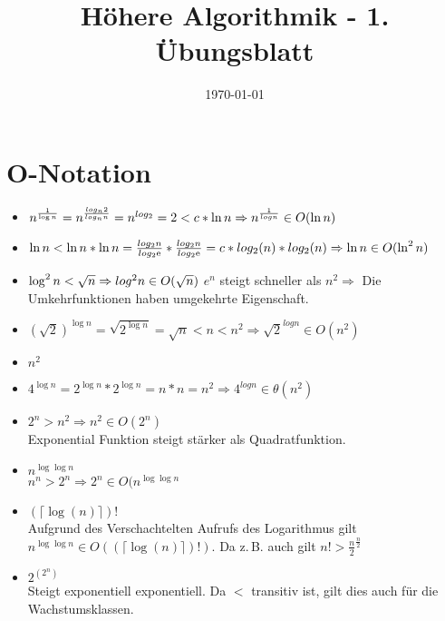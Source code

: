 \documentclass[a4paper,10pt]{scrartcl}
\title{H\"ohere Algorithmik - 1. \"Ubungsblatt}
\author{\Authors}
\date{\today}
\begin{document}
\maketitle

\section{$\boldsymbol{O}$-Notation}
\begin{itemize}
      \item $n^{\frac{1}{\log n}} = n^{\frac{log_n 2}{log_n n}} \\
	= n^{log_ 2} = 2 < c * \ln n \Rightarrow n^{\frac{1}{log n}} \in O(\ln n)$
      \item $\ln n < \ln n * \ln n = \frac{log_2 n}{log_2 \mathrm{e}} * \frac{log_2 n}{log_2 \mathrm{e}} = c * log_2 (n) * log_2 (n) \\
	\Rightarrow \ln n \in O(\ln^2 n)$
      \item $\log^2 n < \sqrt{n} \Rightarrow log^2 n \in O(\sqrt{n})\\ $
	$e^{n}$ steigt schneller als $n^2 \Rightarrow$ Die Umkehrfunktionen haben umgekehrte Eigenschaft.
      \item $(\sqrt{2})^{\log n} = \sqrt{2^{\log n}} = \sqrt{n} < n < n^2 \Rightarrow \sqrt{2}^{log n} \in O(n^2)$\\
      \item $n^2$
       \item $4^{\log n} = 2^{\log n} * 2^{\log n} = n * n = n^2 \Rightarrow 4^{log n} \in \theta(n^2)$\\
	
	\item $2^n > n^2 \Rightarrow n^2 \in O(2^n)$\\
		Exponential Funktion steigt stärker als Quadratfunktion.
	\item $n^{\log \log n}$\\
	    $n^n > 2^n \Rightarrow 2^n \in O(n^{\log \log n}$
	\item $(\lceil \log (n) \rceil )!$\\
		Aufgrund des Verschachtelten Aufrufs des Logarithmus gilt $n^{\log \log n} \in O((\lceil \log (n) \rceil )!)$.
		Da z.\,B. auch gilt $n! > \frac{n}{2}^{\frac{n}{2}}$
	\item $2^{(2^n)}$\\
		Steigt exponentiell exponentiell.
	Da $<$ transitiv ist, gilt dies auch für die Wachstumsklassen.
	
\end{itemize}
\end{document}
